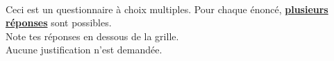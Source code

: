 \documentclass[a4paper,11pt]{article}
\begin{document}
\newpage

\begin{exercice}[(4 points)] \

	\begin{attention}
		Ceci est un questionnaire à choix multiples. Pour chaque énoncé, \textbf{\uline{plusieurs}} \textbf{\uline{réponses}} sont possibles. \\[0.5em]
		Note tes réponses en dessous de la grille. \\[0.5em]
		Aucune justification n'est demandée.

		\begin{other_exemple}
		\end{other_exemple}
	\end{attention}


\end{exercice}
\end{document}
